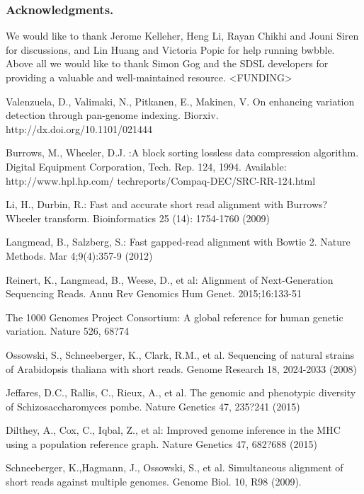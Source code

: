 \documentclass[runningheads,a4paper]{llncs}
\begin{document}
\subsubsection*{Acknowledgments.} We would like to thank Jerome Kelleher, Heng Li, Rayan Chikhi and Jouni Siren for discussions, and Lin Huang and Victoria Popic for help running bwbble. Above all we would like to thank Simon Gog and the SDSL developers for providing a valuable and well-maintained resource. <FUNDING>



\begin{thebibliography}{4}

 Valenzuela, D., Valimaki, N., Pitkanen, E., Makinen, V. On enhancing variation detection through pan-genome indexing. Biorxiv. http://dx.doi.org/10.1101/021444

 Burrows, M., Wheeler, D.J. :A block sorting lossless data compression algorithm. Digital Equipment Corporation, Tech. Rep. 124, 1994. Available: http://www.hpl.hp.com/ techreports/Compaq-DEC/SRC-RR-124.html

 Li, H., Durbin, R.: Fast and accurate short read alignment with Burrows?Wheeler transform. Bioinformatics 25 (14): 1754-1760 (2009)

 Langmead, B., Salzberg, S.: Fast gapped-read alignment with Bowtie 2. Nature Methods. Mar 4;9(4):357-9 (2012)

 Reinert, K., Langmead, B., Weese, D., et al: Alignment of Next-Generation Sequencing Reads. Annu Rev Genomics Hum Genet. 2015;16:133-51

 The 1000 Genomes Project Consortium: A global reference for human genetic variation. Nature 526, 68?74

 Ossowski, S., Schneeberger, K., Clark, R.M., et al. Sequencing of natural strains of Arabidopsis thaliana with short reads. Genome Research 18, 2024-2033 (2008)

 Jeffares, D.C., Rallis, C., Rieux, A., et al. The genomic and phenotypic diversity of Schizosaccharomyces pombe. Nature Genetics 47, 235?241 (2015)

 Dilthey, A., Cox, C., Iqbal, Z., et al: Improved genome inference in the MHC using a population reference graph. Nature Genetics 47, 682?688 (2015)

 Schneeberger, K.,Hagmann, J., Ossowski, S.,  et al. Simultaneous alignment of short reads against multiple genomes. Genome Biol. 10, R98 (2009).


\end{thebibliography}
\end{document}
